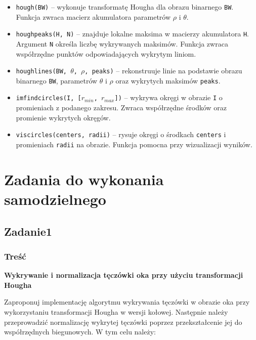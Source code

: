 \begin{itemize}
	\item \texttt{hough(BW)} – wykonuje transformatę Hougha dla obrazu binarnego \texttt{BW}. Funkcja zwraca macierz akumulatora parametrów $\rho$ i $\theta$.
	
	\item \texttt{houghpeaks(H, N)} – znajduje lokalne maksima w macierzy akumulatora \texttt{H}. Argument \texttt{N} określa liczbę wykrywanych maksimów. Funkcja zwraca współrzędne punktów odpowiadających wykrytym liniom.
	
	\item \texttt{houghlines(BW, $\theta$, $\rho$, peaks)} – rekonstruuje linie na podstawie obrazu binarnego \texttt{BW}, parametrów \texttt{$\theta$} i \texttt{$\rho$} oraz wykrytych maksimów \texttt{peaks}.
	
	\item \texttt{imfindcircles(I, [$r_{min}$, $r_{max}$])} – wykrywa okręgi w obrazie \texttt{I} o promieniach z podanego zakresu. Zwraca współrzędne środków oraz promienie wykrytych okręgów.
	
	\item \texttt{viscircles(centers, radii)} – rysuje okręgi o środkach \texttt{centers} i promieniach \texttt{radii} na obrazie. Funkcja pomocna przy wizualizacji wyników.
\end{itemize}

\section{Zadania do wykonania samodzielnego}

\subsection{Zadanie1}

\subsubsection{Treść}

\textbf{Wykrywanie i normalizacja tęczówki oka przy użyciu transformacji Hougha}

Zaproponuj implementację algorytmu wykrywania tęczówki w obrazie oka przy wykorzystaniu
transformacji Hougha w wersji kołowej. Następnie należy przeprowadzić normalizację wykrytej
tęczówki poprzez przekształcenie jej do współrzędnych biegunowych.
W tym celu należy:

